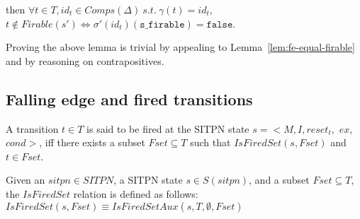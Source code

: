 \documentclass[dvipsnames,12pt]{article}
\begin{document}
\begin{lemma}
  \label{lem:fe-equal-not-firable}
  \fehyps{} then
  $\forall{}t\in{}T,id_t\in{}Comps(\Delta)~s.t.~\gamma(t)=id_t,$
  $t\notin{}Firable(s')\Leftrightarrow\sigma'(id_t)(\texttt{s\_firable})=\mathtt{false}$.
\end{lemma}

\begin{niproof}
  Proving the above lemma is trivial by appealing to
  Lemma~\ref{lem:fe-equal-firable} and by reasoning on
  contrapositives.
\end{niproof}

\subsection{Falling edge and fired transitions}
\label{sec:fe-fired}

\begin{definition}[Fired]
  \label{def:cons-fired}
  A transition $t\in{}T$ is said to be fired at the SITPN state
  $s={<}M,I,reset_t,$ $ex,$ $cond{>}$, iff there exists a subset
  $Fset\subseteq{}T$ such that $IsFiredSet(s,Fset)$ and $t\in{}Fset$.
\end{definition}

\begin{definition}[IsFiredSet]
  \label{def:is-frd-set}
  Given an $sitpn\in{}SITPN$, a SITPN state $s\in{}S(sitpn)$, and a
  subset $Fset\subseteq{}T$, the $IsFiredSet$ relation is defined as follows:\\
  $IsFiredSet(s,Fset)\equiv{}IsFiredSetAux(s,T,\emptyset,Fset)$
\end{definition}
\end{document}

